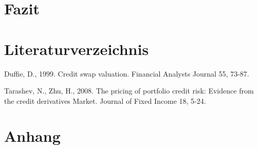 \documentclass[a4paper,12pt]{scrartcl}
\begin{document}
\section{Fazit}
\newpage
\section{Literaturverzeichnis}

Duffie, D., 1999. Credit swap valuation. Financial Analysts Journal 55, 73-87.

Tarashev, N., Zhu, H., 2008. The pricing of portfolio credit risk: Evidence from the credit derivatives Market. Journal of Fixed Income 18, 5-24.
\newpage

\section{Anhang}
\end{document}
